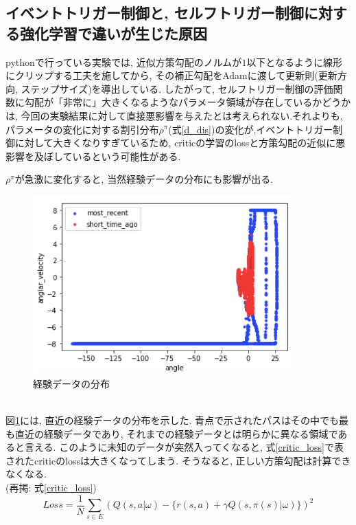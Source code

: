 \documentclass{jsarticle}
\begin{document}
\subsection{イベントトリガー制御と, セルフトリガー制御に対する強化学習で違いが生じた原因}
pythonで行っている実験では, 近似方策勾配のノルムが$1$以下となるように線形にクリップする工夫を施してから, その補正勾配をAdamに渡して更新則(更新方向, ステップサイズ)を導出している.
したがって, セルフトリガー制御の評価関数に勾配が「非常に」大きくなるようなパラメータ領域が存在しているかどうかは, 今回の実験結果に対して直接悪影響を与えたとは考えられない.それよりも, パラメータの変化に対する割引分布$\rho^{\pi}$(式\eqref{d_dis})の変化が,イベントトリガー制御に対して大きくなりすぎているため, criticの学習のlossと方策勾配の近似に悪影響を及ぼしているという可能性がある. \par
$\rho^{\pi}$が急激に変化すると, 当然経験データの分布にも影響が出る.
\begin{figure}[h]
	\centering
 	\includegraphics[width=10cm]{mini_batch.png}
 	\caption{経験データの分布} \label{mini_batch}
\end{figure}\\
図\ref{mini_batch}には, 直近の経験データの分布を示した. 青点で示されたパスはその中でも最も直近の経験データであり, それまでの経験データとは明らかに異なる領域であると言える. このように未知のデータが突然入ってくなると, 式\eqref{critic_loss}で表されたcriticのlossは大きくなってしまう. そうなると, 正しい方策勾配は計算できなくなる.
\\
(再掲: 式\eqref{critic_loss})
\begin{equation*}
	Loss = \frac{1}{N}\sum_{s\in E} (Q(s,a|\omega) - \{r(s,a)+\gamma Q(s,\pi(s)|\omega)\})^2
\end{equation*}
\end{document}
